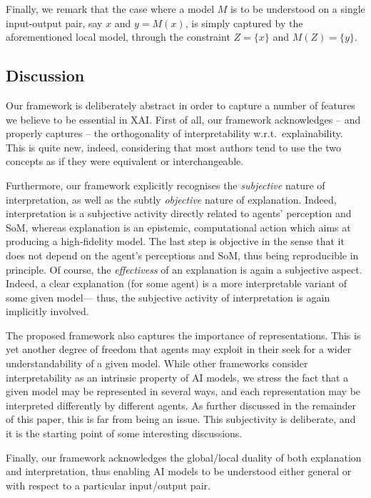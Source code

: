\documentclass[12pt,a4paper,openright,twoside]{book}
\begin{document}
Finally, we remark that the case where a model $M$ is to be understood on a single input-output pair, say $x$ and $y = M(x)$, is simply captured by the aforementioned local model, through the constraint $Z = \{ x \}$ and $M(Z) = \{ y \}$.

\subsection{Discussion}

Our framework is deliberately abstract in order to capture a number of features we believe to be essential in XAI.
%
First of all, our framework acknowledges -- and properly captures -- the orthogonality of interpretability w.r.t.\ explainability. 
%
This is quite new, indeed, considering that most authors tend to use the two concepts as if they were equivalent or interchangeable.

Furthermore, our framework explicitly recognises the \emph{subjective} nature of interpretation, as well as the subtly \emph{objective} nature of explanation.
%
Indeed, interpretation is a subjective activity directly related to agents' perception and SoM, whereas explanation is an epistemic, computational action which aims at producing a high-fidelity model.
%
The last step is objective in the sense that it does not depend on the agent's perceptions and SoM, thus being reproducible in principle.
%
Of course, the \emph{effectivess} of an explanation is again a subjective aspect.
%
Indeed, a clear explanation (for some agent) is a more interpretable variant of some given model--- thus, the subjective activity of interpretation is again implicitly involved.

The proposed framework also captures the importance of representations.
%
This is yet another degree of freedom that agents may exploit in their seek for a wider understandability of a given model.
%
While other frameworks consider interpretability as an intrinsic property of AI models, we stress the fact that a given model may be represented in several ways, and each representation may be interpreted differently by different agents.
%
As further discussed in the remainder of this paper, this is far from being an issue.
%
This subjectivity is deliberate, and it is the starting point of some interesting discussions.

Finally, our framework acknowledges the global/local duality of both explanation and interpretation, thus enabling AI models to be understood either general or with respect to a particular input/output pair.
\end{document}
